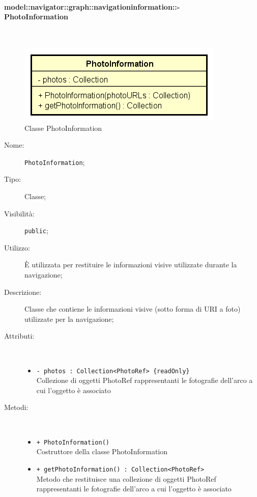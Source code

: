 \documentclass[../DefinizioneDiProdotto.tex]{subfiles}
\begin{document}
\paragraph{model::navigator::graph::navigationinformation::-\\PhotoInformation}
\
\begin{figure}[H]
	\centering
	\includegraphics[width=\maxwidth]{img/PhotoInformation.png}
	\caption{Classe PhotoInformation}\label{fig:model::navigator::graph::navigationinformation::PhotoInformation} 
\end{figure}
\begin{description}
	\item[Nome:] \texttt{PhotoInformation};
	\item[Tipo:] Classe;
	\item[Visibilità:] \texttt{public};
	\item[Utilizzo:] È utilizzata per restituire le informazioni visive utilizzate durante la navigazione;
	\item[Descrizione:] Classe che contiene le informazioni visive (sotto forma di URI a foto) utilizzate per la navigazione;
	\item[Attributi:] \
	\begin{itemize}
		\item \texttt{- photos : Collection<PhotoRef> \{readOnly\}}\\
		Collezione di oggetti PhotoRef rappresentanti le fotografie dell'arco a cui l'oggetto è associato
		
	\end{itemize}
	\item[Metodi:] \
	\begin{itemize}
		\item \texttt{+ PhotoInformation()}\\
		Costruttore della classe PhotoInformation
		\item \texttt{+ getPhotoInformation() : Collection<PhotoRef>}\\
		Metodo che restituisce una collezione di oggetti PhotoRef rappresentanti le fotografie dell'arco a cui l'oggetto è associato
	\end{itemize}
\end{description}
\end{document}

